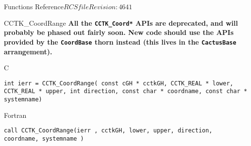 \begin{cactuspart}{ Functions Reference}{$RCSfile$}{$Revision: 4641 $}
\begin{FunctionDescription}{CCTK\_CoordRange}
{\textbf{All the \texttt{CCTK\_Coord*} APIs are deprecated,
and will probably be phased out fairly soon.
New code should use the APIs provided by the \texttt{CoordBase} thorn
instead (this lives in the \texttt{CactusBase} arrangement).}
}
\label{CCTK-CoordRange}
\begin{SynopsisSection}
\begin{Synopsis}{C}
\begin{verbatim}int ierr = CCTK_CoordRange( const cGH * cctkGH, CCTK_REAL * lower, CCTK_REAL * upper, int direction, const char * coordname, const char * systemname)\end{verbatim}
\end{Synopsis}
\begin{Synopsis}{Fortran}
\begin{verbatim}call CCTK_CoordRange(ierr , cctkGH, lower, upper, direction, coordname, systemname )


\end{verbatim}
\end{Synopsis}
\end{SynopsisSection}
\end{FunctionDescription}
\end{cactuspart}
